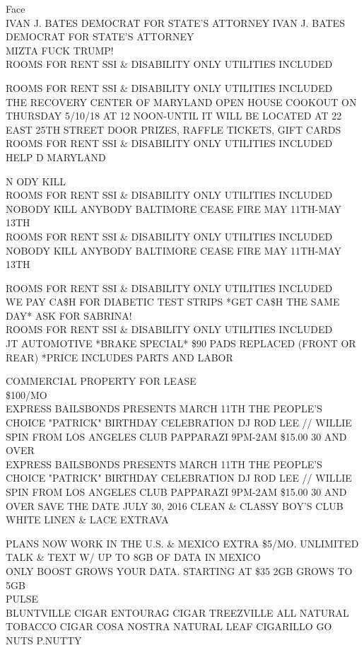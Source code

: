 \documentclass[10pt,letterpaper]{article}
\begin{document}
Face\\
IVAN J. BATES DEMOCRAT FOR STATE'S ATTORNEY IVAN J. BATES DEMOCRAT FOR STATE'S ATTORNEY\\
MIZTA FUCK TRUMP!\\
ROOMS FOR RENT SSI \& DISABILITY ONLY UTILITIES INCLUDED

ROOMS FOR RENT SSI \& DISABILITY ONLY UTILITIES INCLUDED\\
THE RECOVERY CENTER OF MARYLAND OPEN HOUSE COOKOUT ON THURSDAY 5/10/18 AT 12 NOON{-}UNTIL IT WILL BE LOCATED AT 22 EAST 25TH STREET DOOR PRIZES, RAFFLE TICKETS, GIFT CARDS\\
ROOMS FOR RENT SSI \& DISABILITY ONLY UTILITIES INCLUDED\\
HELP D MARYLAND

N ODY KILL\\
ROOMS FOR RENT SSI \& DISABILITY ONLY UTILITIES INCLUDED\\
NOBODY KILL ANYBODY BALTIMORE CEASE FIRE MAY 11TH{-}MAY 13TH\\
ROOMS FOR RENT SSI \& DISABILITY ONLY UTILITIES INCLUDED NOBODY KILL ANYBODY BALTIMORE CEASE FIRE MAY 11TH{-}MAY 13TH

ROOMS FOR RENT SSI \& DISABILITY ONLY UTILITIES INCLUDED\\
WE PAY CA\$H FOR DIABETIC TEST STRIPS *GET CA\$H THE SAME DAY* ASK FOR SABRINA!\\
ROOMS FOR RENT SSI \& DISABILITY ONLY UTILITIES INCLUDED\\
JT AUTOMOTIVE *BRAKE SPECIAL* \$90 PADS REPLACED (FRONT OR REAR) *PRICE INCLUDES PARTS AND LABOR

COMMERCIAL PROPERTY FOR LEASE\\
\$100/MO\\
EXPRESS BAILSBONDS PRESENTS MARCH 11TH THE PEOPLE'S CHOICE "PATRICK" BIRTHDAY CELEBRATION DJ ROD LEE // WILLIE SPIN FROM LOS ANGELES CLUB PAPPARAZI 9PM{-}2AM \$15.00 30 AND OVER\\
EXPRESS BAILSBONDS PRESENTS MARCH 11TH THE PEOPLE'S CHOICE "PATRICK" BIRTHDAY CELEBRATION DJ ROD LEE // WILLIE SPIN FROM LOS ANGELES CLUB PAPPARAZI 9PM{-}2AM \$15.00 30 AND OVER SAVE THE DATE JULY 30, 2016 CLEAN \& CLASSY BOY'S CLUB WHITE LINEN \& LACE EXTRAVA

PLANS NOW WORK IN THE U.S. \& MEXICO EXTRA \$5/MO. UNLIMITED TALK \& TEXT W/ UP TO 8GB OF DATA IN MEXICO\\
ONLY BOOST GROWS YOUR DATA.  STARTING AT \$35 2GB GROWS TO 5GB\\
PULSE\\
BLUNTVILLE CIGAR ENTOURAG CIGAR TREEZVILLE ALL NATURAL TOBACCO CIGAR COSA NOSTRA NATURAL LEAF CIGARILLO GO NUTS P.NUTTY
\end{document}
